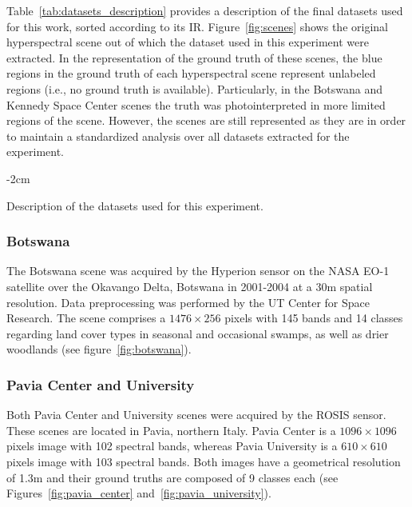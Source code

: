 \documentclass[preprint,12pt]{elsarticle}
\begin{document}
Table~\ref{tab:datasets_description} provides a description of the final
datasets used for this work, sorted according to its IR.
Figure~\ref{fig:scenes} shows the original hyperspectral scene out of which
the dataset used in this experiment were extracted. In the representation of
the ground truth of these scenes, the blue regions in the ground truth of each
hyperspectral scene represent unlabeled regions (i.e., no  ground truth is
available). Particularly, in the Botswana and Kennedy Space Center scenes the
truth was photointerpreted in more limited regions of the scene. However, the
scenes are still represented as they are in order to maintain a standardized
analysis over all datasets extracted for the experiment.

\begin{table}
	\centering
    \addtolength{\leftskip} {-2cm}
    \addtolength{\rightskip}{-2cm}
    \captionsetup{justification=centering}
    \caption{Description of the datasets used for this
    experiment.\label{tab:datasets_description}}
\end{table}

\subsubsection*{Botswana}

The Botswana scene was acquired by the Hyperion sensor on the NASA EO-1
satellite over the Okavango Delta, Botswana in 2001-2004 at a 30m spatial
resolution. Data preprocessing was performed by the UT Center for Space
Research. The scene comprises a $1476 \times 256$ pixels with 145 bands and 14
classes regarding land cover types in seasonal and occasional swamps, as well
as drier woodlands (see figure~\ref{fig:botswana}).

\subsubsection*{Pavia Center and University}

Both Pavia Center and University scenes were acquired by the ROSIS sensor.
These scenes are located in Pavia, northern Italy. Pavia Center is a $1096
\times 1096$ pixels image with 102 spectral bands, whereas Pavia University is
a $610 \times 610$ pixels image with 103 spectral bands. Both images have a
geometrical resolution of 1.3m and their ground truths are
composed of 9 classes each (see Figures~\ref{fig:pavia_center}
and~\ref{fig:pavia_university}).
\end{document}
